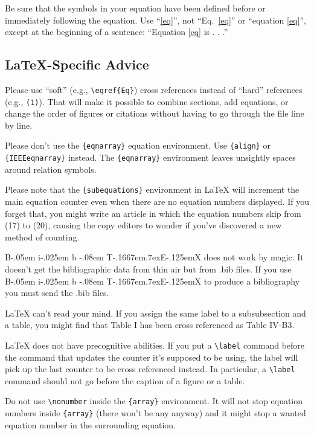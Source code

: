 \documentclass[conference]{IEEEtran}
\def\BibTeX{
    {\rm B\kern-.05em{
        \sc i\kern-.025em b
    }\kern-.08em T\kern-.1667em\lower.7ex\hbox{E}\kern-.125emX}
}
\begin{document}
Be sure that the 
symbols in your equation have been defined before or immediately following 
the equation. Use ``\eqref{eq}'', not ``Eq.~\eqref{eq}'' or ``equation \eqref{eq}'', except at 
the beginning of a sentence: ``Equation \eqref{eq} is . . .''

\subsection{\LaTeX-Specific Advice}

Please use ``soft'' (e.g., \verb|\eqref{Eq}|) cross references instead
of ``hard'' references (e.g., \verb|(1)|). That will make it possible
to combine sections, add equations, or change the order of figures or
citations without having to go through the file line by line.

Please don't use the \verb|{eqnarray}| equation environment. Use
\verb|{align}| or \verb|{IEEEeqnarray}| instead. The \verb|{eqnarray}|
environment leaves unsightly spaces around relation symbols.

Please note that the \verb|{subequations}| environment in {\LaTeX}
will increment the main equation counter even when there are no
equation numbers displayed. If you forget that, you might write an
article in which the equation numbers skip from (17) to (20), causing
the copy editors to wonder if you've discovered a new method of
counting.

{\BibTeX} does not work by magic. It doesn't get the bibliographic
data from thin air but from .bib files. If you use {\BibTeX} to produce a
bibliography you must send the .bib files. 

{\LaTeX} can't read your mind. If you assign the same label to a
subsubsection and a table, you might find that Table I has been cross
referenced as Table IV-B3. 

{\LaTeX} does not have precognitive abilities. If you put a
\verb|\label| command before the command that updates the counter it's
supposed to be using, the label will pick up the last counter to be
cross referenced instead. In particular, a \verb|\label| command
should not go before the caption of a figure or a table.

Do not use \verb|\nonumber| inside the \verb|{array}| environment. It
will not stop equation numbers inside \verb|{array}| (there won't be
any anyway) and it might stop a wanted equation number in the
surrounding equation.
\end{document}
